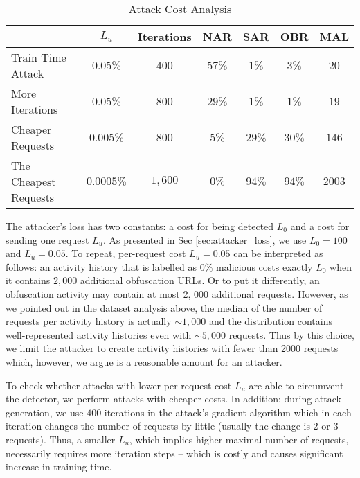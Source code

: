 \begin{table}[t]
\centering

    \begin{tabular}{|l|c|c||c|c|c|c|}
    \hline
                          & $L_u$     & Iterations & NAR      & SAR      & OBR      & MAL      \\ \hline\hline
    Train Time Attack     & $0.05 \%$ & $400$   & $57\%$ & $1 \%$ & $3 \%$ & $20$ \\ \hline
    More Iterations       & $0.05 \%$ & $800$   & $29 \%$ & $1 \%$ & $1 \%$ & $19$ \\ \hline
    Cheaper Requests      & $0.005 \%$ & $800$   & $5\%$ & $29\%$ & $30 \%$ & $146$ \\ \hline
    The Cheapest Requests & $0.0005 \%$ & $1,600$   & $0 \%$ & $94 \%$ & $94 \%$ & $2003$ \\ \hline
    \end{tabular}

\caption{Attack Cost Analysis}
\label{tab:attack-cost-analysis}

\end{table}

The attacker's loss has two constants: a cost for being detected $L_0$ and a cost for sending one request $L_u$. As presented in Sec \ref{sec:attacker_loss}, we use $L_0 = 100$ and $L_u = 0.05$. To repeat, per-request cost $L_u = 0.05$ can be interpreted as follows: an activity history that is labelled as $0\%$ malicious costs exactly $L_0$ when it contains $2,000$ additional obfuscation URLs. Or to put it differently, an obfuscation activity may contain at most 2, 000 additional requests. However, as we pointed out in the dataset analysis above, the median of the number of requests per activity history is actually $\sim 1,000$ and the distribution contains well-represented activity histories even with $\sim 5,000$ requests.
Thus by this choice, we limit the attacker to create activity histories with fewer than 2000 requests which, however, we argue is a reasonable amount for an attacker.

To check whether attacks with lower per-request cost $L_u$ are able to circumvent the detector, we perform attacks with cheaper costs. In addition: during attack generation, we use $400$ iterations in the attack's gradient algorithm which in each iteration changes the number of requests by little (usually the change is $2$ or $3$ requests). Thus, a smaller $L_u$, which implies higher maximal number of requests, necessarily requires more iteration steps – which is costly and causes significant increase in training time.


